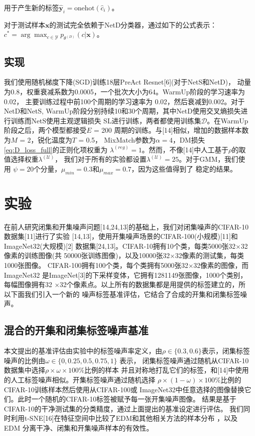 \documentclass[11pt]{article}
\begin{document}
用于产生新的标签$\hat{\mathbf{y}}_i = \text{onehot}(\hat{c}_i)$。

对于测试样本$\mathbf{x}$的测试完全依赖于NetD分类器，通过如下的公式表示：
$c^* = \arg\max_{c \in \mathcal{Y}} p_{\theta^{(D)}}(c|\mathbf{x})$。
\subsection{实现}
我们使用随机梯度下降(SGD)训练18层PreAct Resnet[6](对于NetS和NetD)，
动量为0.8，权重衰减系数为0.0005，一个批次大小为64。WarmUp阶段的学习速率为0.02，
主要训练过程中前100个周期的学习速率为 0.02，然后衰减到0.002。对于NetD和NetS, 
WarmUp阶段分别持续10和30个周期，其中NetD使用交叉熵损失进行训练而NetS使用主观逻辑损失
SL进行训练，两者都使用训练集$\mathcal{D}$。在WarmUp阶段之后，两个模型都接受$E$ = 200
周期的训练。与[14]相似，增加的数据样本数为$M$ = 2，锐化温度为$T$ = 0.5，
MixMatch参数为$\alpha= 4$，DM损失\eqref{eq:D_loss_full}的正则化项权重为
$\lambda^{(reg)}=1$。然而，不像[14]中人工基于$\rho$的取值选择权重$\lambda^{(\mathcal{U})}$，
我们对于所有的实验都设置$\lambda^{(\mathcal{U})} = 25$。对于GMM，我们使用
$\psi = 20$个分量，$\mu_{min} = 0.3$和$\mu_{max} = 0.7$，因为这些值得到了
稳定的结果。


\section{实验}
在前人研究闭集和开集噪声问题[14,24,13]的基础上，我们对闭集噪声的CIFAR-10数据集[11]进行了实验
[14,13]，使用开集噪声场景的CIFAR-100(小规模)[11]和ImageNet32(大规模)[2]
数据集[24,13]。CIFAR-10拥有10个类，每类5000张32$\times$32像素的训练图像(共
50000张训练图像)，以及10000张32$\times$32像素的测试集，每类1000张图像。
CIFAR-100拥有100个类，每个类拥有5000张32$\times$32像素的图像，而ImageNet32
是ImageNet[3]的下采样变体，它拥有1281149张图像，1000个类别，每幅图像拥有32
$\times$32个像素点。以上所有的数据集都是用提供的标签建立的，所以下面我们引入一个新的
噪声标签基准评估，它结合了合成的开集和闭集标签噪声。

\subsection{混合的开集和闭集标签噪声基准}
本文提出的基准评估由实验中的标签噪声率定义，由$\rho \in \{0.3,0.6\}$表示，闭集标签
噪声的比例由$\omega \in \{0,0.25,0.5,0.75,1\}$ 表示，
闭集标签噪声通过随机从CIFAR-10数据集中选择$\rho\times\omega\times100\%$比例的样本
并且对称地打乱它们的标签，和[14]中使用的人工标签噪声相似。开集标签噪声通过随机选择
$\rho\times(1-\omega)\times100\%$比例的CIFAR-10训练样本然后使用从CIFAR-100或
ImageNet32中任意选择的图像替换它们。此时一个随机的CIFAR-10标签被赋予每一张开集噪声图像。
结果是基于CIFAR-10的干净测试集的分类精度，通过上面提出的基准设定进行评估。
我们同时利用t-SNE[16]在特征空间中比较了EDM和其他相关方法的样本分布 ，以及EDM
分离干净、闭集和开集噪声样本的有效性。
\end{document}
